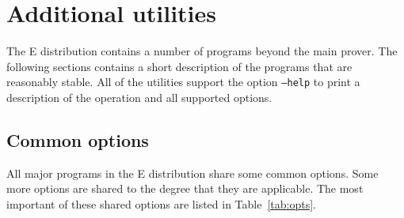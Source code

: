 \documentclass{report}
\begin{document}
\chapter{Additional utilities}

The E distribution contains a number of programs beyond the main
prover. The following sections contains a short description of the
programs that are reasonably stable. All of the utilities support the
option \texttt{--help} to print a description of the operation and all
supported options.

\section{Common options}

All major programs in the E distribution share some common
options. Some more options are shared to the degree that they are
applicable. The most important of these shared options are listed in
Table~\ref{tab:opts}.
\end{document}
